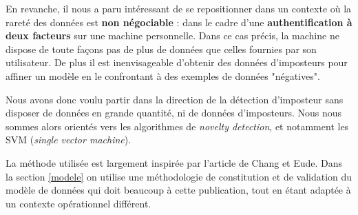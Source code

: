 En revanche, il nous a paru intéressant de se repositionner dans un contexte où la rareté des données est \textbf{non négociable} : dans le cadre d'une \textbf{authentification à deux facteurs} sur une machine personnelle. Dans ce cas précis, la machine ne dispose de toute façons pas de plus de données que celles fournies par son utilisateur. De plus il est inenvisageable d'obtenir des données d'imposteurs pour affiner un modèle en le confrontant à des exemples de données "négatives".

Nous avons donc voulu partir dans la direction de la détection d'imposteur sans disposer de données en grande quantité, ni de données d'imposteurs. Nous nous sommes alors orientés vers les algorithmes de \textit{novelty detection}, et notamment les SVM (\textit{single vector machine}).

La méthode utilisée est largement inspirée par l'article de Chang et Eude\cite{doi:10.1111/coin.12122}.
Dans la section \ref{modele} on utilise une méthodologie de constitution et de validation du modèle de données qui doit beaucoup à cette publication, tout en étant adaptée à un contexte opérationnel différent.

